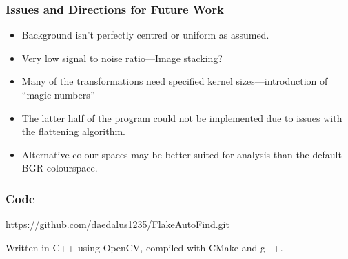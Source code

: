 \documentclass{beamer}
\begin{document}
\begin{frame}
	\frametitle{Issues and Directions for Future Work}
	\begin{itemize}
		\item<1-> Background isn't perfectly centred or uniform as assumed.
		\item<2-> Very low signal to noise ratio---Image stacking?
		\item<3-> Many of the transformations need specified kernel sizes---introduction of ``magic numbers''
		\item<4-> The latter half of the program could not be implemented due to issues with the flattening algorithm.
		\item<5-> Alternative colour spaces may be better suited for analysis than the default BGR colourspace.
	\end{itemize}
	
\end{frame}

\begin{frame}
	\frametitle{Code}
	https://github.com/daedalus1235/FlakeAutoFind.git

	Written in C++ using OpenCV, compiled with CMake and g++.
\end{frame}
\end{document}
